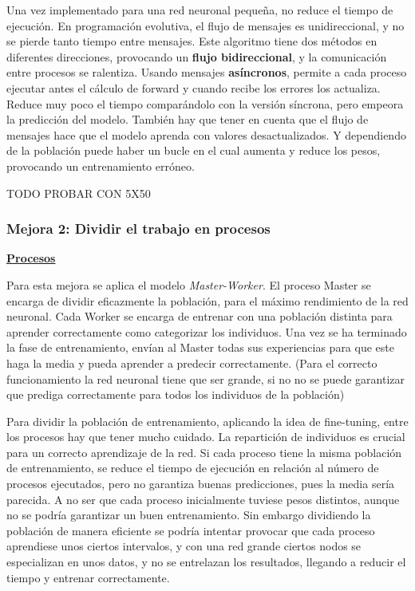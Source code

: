 			Una vez implementado para una red neuronal pequeña, no reduce el tiempo de ejecución. En programación evolutiva, el flujo de mensajes es unidireccional, y no se pierde tanto tiempo entre mensajes. Este algoritmo tiene dos métodos en diferentes direcciones, provocando un \textbf{flujo bidireccional}, y la comunicación entre procesos se ralentiza. Usando mensajes \textbf{asíncronos}, permite a cada proceso ejecutar antes el cálculo de forward y cuando recibe los errores los actualiza. Reduce muy poco el tiempo comparándolo con la versión síncrona, pero empeora la predicción del modelo.
			También hay que tener en cuenta que el flujo de mensajes hace que el modelo aprenda con valores desactualizados. Y dependiendo de la población puede haber un bucle en el cual aumenta y reduce los pesos, provocando un entrenamiento erróneo.

			
			\color{blue} TODO PROBAR CON 5X50
			
			\color{black}
			\newpage
			
		\subsubsection{Mejora 2: Dividir el trabajo en procesos}
		
			\begin{flushleft}			
			\begin{mdframed}[roundcorner=5pt]
				\textbf{\underline{Procesos}}
				\vspace{0.1cm}
				
				\scriptsize		
				Para esta mejora se aplica el modelo \textit{Master-Worker}. El proceso Master se encarga de dividir eficazmente la población, para el máximo rendimiento de la red neuronal. Cada Worker se encarga de entrenar con una población distinta para aprender correctamente como categorizar los individuos. Una vez se ha terminado la fase de entrenamiento, envían al Master todas sus experiencias para que este haga la media y pueda aprender a predecir correctamente. (Para el correcto funcionamiento la red neuronal tiene que ser grande, si no no se puede garantizar que prediga correctamente para todos los individuos de la población)
			\end{mdframed}
			\end{flushleft}

			Para dividir la población de entrenamiento, aplicando la idea de fine-tuning, entre los procesos hay que tener mucho cuidado. La repartición de individuos es crucial para un correcto aprendizaje de la red. Si cada proceso tiene la misma población de entrenamiento, se reduce el tiempo de ejecución en relación al número de procesos ejecutados, pero no garantiza buenas predicciones, pues la media sería parecida. A no ser que cada proceso inicialmente tuviese pesos distintos, aunque no se podría garantizar un buen entrenamiento. Sin embargo dividiendo la población de manera eficiente se podría intentar provocar que cada proceso aprendiese unos ciertos intervalos, y con una red grande ciertos nodos se especializan en unos datos, y no se entrelazan los resultados, llegando a reducir el tiempo y entrenar correctamente.
			
